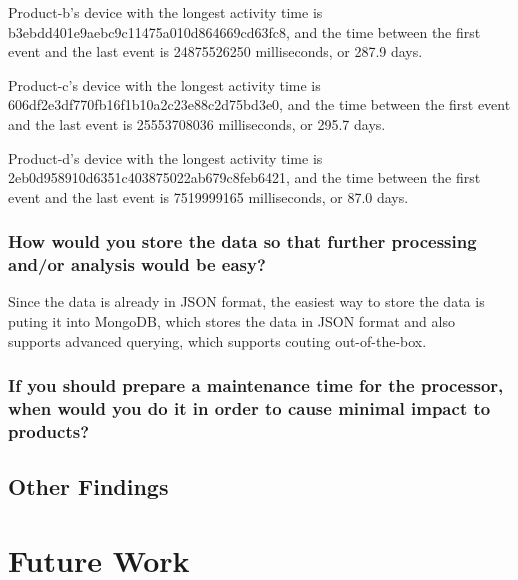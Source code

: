 \documentclass[12pt,letter]{article}
\begin{document}
  Product-b's device with the longest activity time is b3ebdd401e9aebc9c11475a010d864669cd63fc8, and the
  time between the first event and the last event is 24875526250 milliseconds,
  or 287.9 days.

  Product-c's device with the longest activity time is
  606df2e3df770fb16f1b10a2c23e88c2d75bd3e0, and the
  time between the first event and the last event is 25553708036 milliseconds,
  or 295.7 days.

  Product-d's device with the longest activity time is
  2eb0d958910d6351c403875022ab679c8feb6421, and the
  time between the first event and the last event is 7519999165 milliseconds,
  or 87.0 days.

  \subsubsection{How would you store the data so that further processing and/or
  analysis would be easy?}
  Since the data is already in JSON format, the easiest way to store the data is
  puting it into MongoDB, which stores the data in JSON format and also supports
  advanced querying, which supports couting out-of-the-box.

  \subsubsection{If you should prepare a maintenance time for the processor,
  when would you do it in order to cause minimal impact to products?}

  \subsection{Other Findings}

  \section{Future Work}
\end{document}
